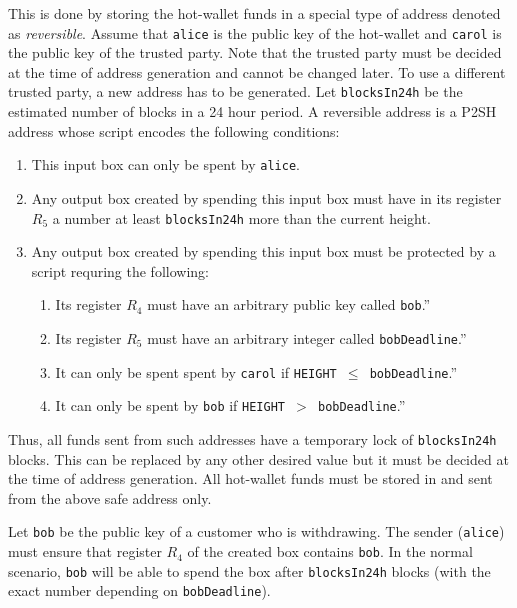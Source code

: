 \documentclass[11pt]{article}
\begin{document}
This is done by storing the hot-wallet funds in a special type of address denoted as {\em reversible}. Assume that \texttt{alice} is the public key of the hot-wallet and \texttt{carol} is the public key of the trusted party. Note that the trusted party must be decided at the time of address generation and cannot be changed later. To use a different trusted party, a new address has to be generated. Let \texttt{blocksIn24h} be the estimated number of blocks in a 24 hour period. A reversible address is a P2SH
address whose script encodes the following conditions:   
\begin{enumerate}
	\item This input box can only be spent by \texttt{alice}.
	\item Any output box created by spending this input box must have in its register $R_5$ a number at least \texttt{blocksIn24h} more than the current height. 
	\item Any output box created by spending this input box must be protected by a script requring the following: 	
	\begin{enumerate}
		\item Its register $R_4$ must have an arbitrary public key called \texttt{bob}.'' 
		\item Its register $R_5$ must have an arbitrary integer called \texttt{bobDeadline}.'' 
		\item It can only be spent spent by \texttt{carol} if \texttt{HEIGHT $\leq$ bobDeadline}.''
		\item It can only be spent by \texttt{bob} if \texttt{HEIGHT $>$ bobDeadline}.''	
	\end{enumerate}  
\end{enumerate}

Thus, all funds sent from such addresses have a temporary lock of \texttt{blocksIn24h} blocks. This can be replaced by any other desired value but it must be decided at the time of address generation. All hot-wallet funds must be stored in and sent from the above safe address only. 

Let \texttt{bob} be the public key of a customer who is withdrawing. The sender (\texttt{alice}) must ensure that register $R_4$ of the created box contains \texttt{bob}. In the normal scenario, \texttt{bob} will be able to spend the box after \texttt{blocksIn24h} blocks (with the exact number depending on \texttt{bobDeadline}). 
\end{document}
